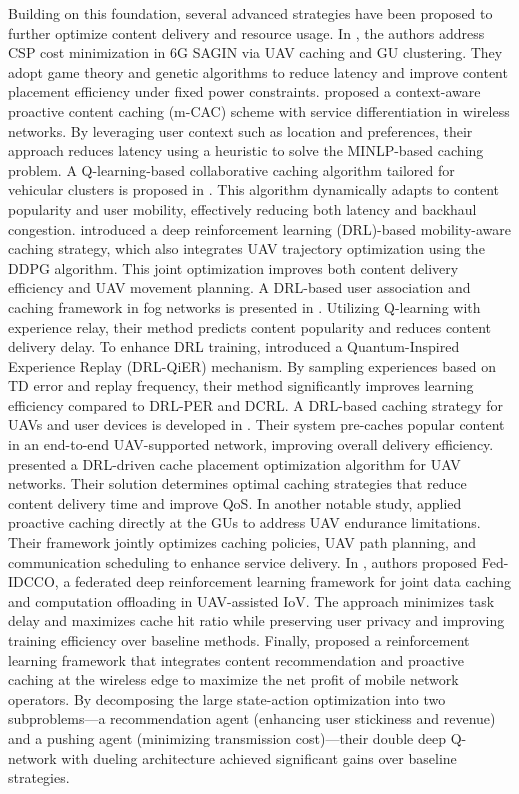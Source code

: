 \documentclass[journal]{IEEEtran}
\begin{document}
Building on this foundation, several advanced strategies have been proposed to further optimize content delivery and resource usage. In \cite{10667821}, the authors address CSP cost minimization in 6G SAGIN via UAV caching and GU clustering. They adopt game theory and genetic algorithms to reduce latency and improve content placement efficiency under fixed power constraints. \cite{muller2016context} proposed a context-aware proactive content caching (m-CAC) scheme with service differentiation in wireless networks. By leveraging user context such as location and preferences, their approach reduces latency using a heuristic to solve the MINLP-based caching problem. A Q-learning-based collaborative caching algorithm tailored for vehicular clusters is proposed in \cite{bi2023collaborative}. This algorithm dynamically adapts to content popularity and user mobility, effectively reducing both latency and backhaul congestion. \cite{anokye2021deep} introduced a deep reinforcement learning (DRL)-based mobility-aware caching strategy, which also integrates UAV trajectory optimization using the DDPG algorithm. This joint optimization improves both content delivery efficiency and UAV movement planning. A DRL-based user association and caching framework in fog networks is presented in \cite{yan2020machine}. Utilizing Q-learning with experience relay, their method predicts content popularity and reduces content delivery delay. To enhance DRL training, \cite{wei2021deep} introduced a Quantum-Inspired Experience Replay (DRL-QiER) mechanism. By sampling experiences based on TD error and replay frequency, their method significantly improves learning efficiency compared to DRL-PER and DCRL. A DRL-based caching strategy for UAVs and user devices is developed in \cite{wang2021deep}. Their system pre-caches popular content in an end-to-end UAV-supported network, improving overall delivery efficiency. \cite{wu2020deep} presented a DRL-driven cache placement optimization algorithm for UAV networks. Their solution determines optimal caching strategies that reduce content delivery time and improve QoS. 
In another notable study, \cite{8374947} applied proactive caching directly at the GUs to address UAV endurance limitations. Their framework jointly optimizes caching policies, UAV path planning, and communication scheduling to enhance service delivery.
In \cite{huang2024joint}, authors proposed Fed-IDCCO, a federated deep reinforcement learning framework for joint data caching and computation offloading in UAV-assisted IoV. The approach minimizes task delay and maximizes cache hit ratio while preserving user privacy and improving training efficiency over baseline methods. Finally, \cite{liu2019deep} proposed a reinforcement learning framework that integrates content recommendation and proactive caching at the wireless edge to maximize the net profit of mobile network operators. By decomposing the large state-action optimization into two subproblems—a recommendation agent (enhancing user stickiness and revenue) and a pushing agent (minimizing transmission cost)—their double deep Q-network with dueling architecture achieved significant gains over baseline strategies.
\end{document}
